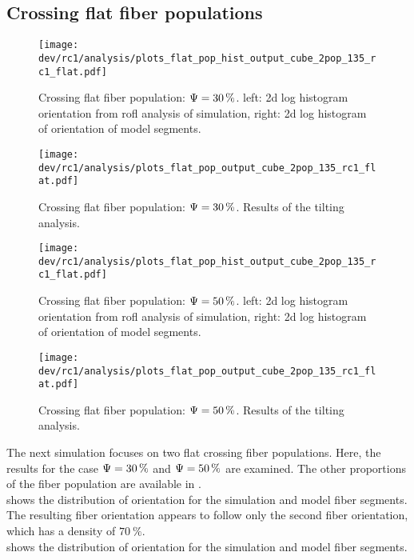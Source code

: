 \subsection{Crossing flat fiber populations}
\label{sec:resCrossFlat}
%
\begin{figure}[!t]
\centering
\texttt{[image: dev/rc1/analysis/plots\_flat\_pop\_hist\_output\_cube\_2pop\_135\_rc1\_flat.pdf]}
\caption[sim]{Crossing flat fiber population: $\textnormal{$\Psi$}=\SI{30}{\percent}$. left: 2d log histogram orientation from rofl analysis of simulation, right: 2d log histogram of orientation of model segments. }
\label{fig:flat_03_fiber_pop_hist}
\end{figure}
%
\begin{figure}[!p]
\centering
\texttt{[image: dev/rc1/analysis/plots\_flat\_pop\_output\_cube\_2pop\_135\_rc1\_flat.pdf]}
\caption[]{Crossing flat fiber population: $\textnormal{$\Psi$}=\SI{30}{\percent}$. Results of the tilting analysis.}
\label{fig:flat_03_fiber_pop_rofl}
\end{figure}
%
\begin{figure}[!t]
\centering
\texttt{[image: dev/rc1/analysis/plots\_flat\_pop\_hist\_output\_cube\_2pop\_135\_rc1\_flat.pdf]}
\caption[sim]{Crossing flat fiber population: $\textnormal{$\Psi$}=\SI{50}{\percent}$. left: 2d log histogram orientation from rofl analysis of simulation, right: 2d log histogram of orientation of model segments. }
\label{fig:flat_05_fiber_pop_hist}
\end{figure}
%
\begin{figure}[!p]
\centering
\texttt{[image: dev/rc1/analysis/plots\_flat\_pop\_output\_cube\_2pop\_135\_rc1\_flat.pdf]}
\caption[]{Crossing flat fiber population: $\textnormal{$\Psi$}=\SI{50}{\percent}$. Results of the tilting analysis.}
\label{fig:flat_05_fiber_pop_rofl}
\end{figure}
%
The next simulation focuses on two flat crossing fiber populations.
Here, the results for the case $\textnormal{$\Psi$} = \SI{30}{\percent}$ and $\textnormal{$\Psi$} = \SI{50}{\percent}$ are examined.
The other proportions of the fiber population are available in .
\\
%
 shows the distribution of orientation for the simulation and model fiber segments.
The resulting fiber orientation appears to follow only the second fiber orientation, which has a density of $\SI{70}{\percent}$.
\\
 shows the distribution of orientation for the simulation and model fiber segments.
